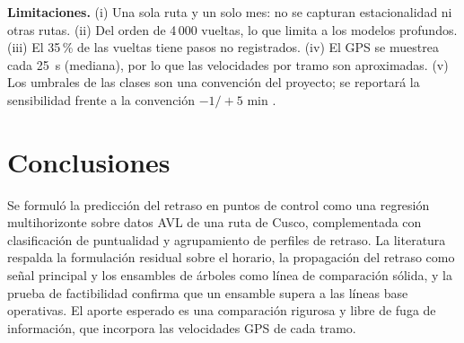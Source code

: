 \documentclass[conference,spanish]{IEEEtran}
\begin{document}
\textbf{Limitaciones.} (i) Una sola ruta y un solo mes: no se capturan estacionalidad ni otras rutas. (ii) Del orden de 4\,000 vueltas, lo que limita a los modelos profundos. (iii) El 35\,\% de las vueltas tiene pasos no registrados. (iv) El GPS se muestrea cada 25~s (mediana), por lo que las velocidades por tramo son aproximadas. (v) Los umbrales de las clases son una convención del proyecto; se reportará la sensibilidad frente a la convención $-1/+5$ min \cite{tcrp2003}.

\section{Conclusiones}

Se formuló la predicción del retraso en puntos de control como una regresión multihorizonte sobre datos AVL de una ruta de Cusco, complementada con clasificación de puntualidad y agrupamiento de perfiles de retraso. La literatura respalda la formulación residual sobre el horario, la propagación del retraso como señal principal y los ensambles de árboles como línea de comparación sólida, y la prueba de factibilidad confirma que un ensamble supera a las líneas base operativas. El aporte esperado es una comparación rigurosa y libre de fuga de información, que incorpora las velocidades GPS de cada tramo.
\end{document}
